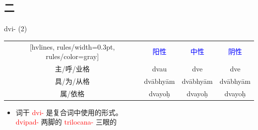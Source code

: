 \documentclass[17pt]{beamer}
\newcommand{\nounstem}[1]{\textcolor{red}{#1\nobreakdash-}}
\newcommand{\fullpada}[1]{\textcolor{OliveGreen}{#1}}
\newcommand{\important}[1]{\textcolor{blue}{#1}}
\begin{document}
\subsection{二}
\begin{frame}{dvi- (2)}
  \small
  \centering
  \begin{NiceTabular}{|c|c|c|c|}[hvlines, rules/width=0.3pt, rules/color=gray]
    & \important{阳性} & \important{中性} & \important{阴性} \\
    主/呼/业格 & \fullpada{dvau} & \fullpada{dve} & \fullpada{dve} \\
    具/为/从格 & \fullpada{dvābhyām} & \fullpada{dvābhyām} & \fullpada{dvābhyām} \\
    属/依格   & \fullpada{dvayoḥ} & \fullpada{dvayoḥ} & \fullpada{dvayoḥ} \\
  \end{NiceTabular}
  \begin{itemize}
    \item 词干 \nounstem{dvi} 是复合词中使用的形式。\\
    \nounstem{dvipad} 两脚的 \nounstem{trilocana} 三眼的
  \end{itemize}
\end{frame}
\end{document}
